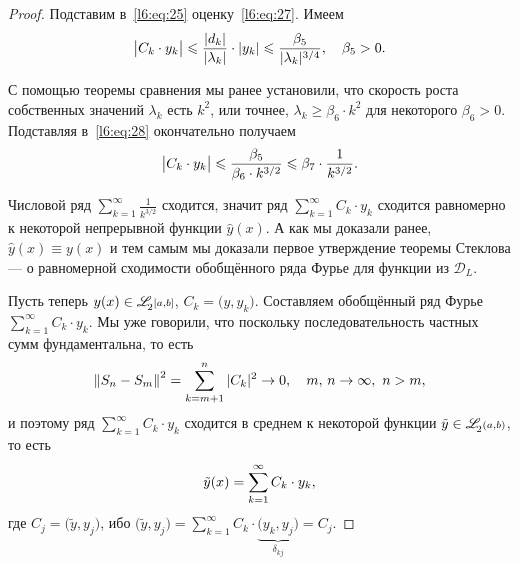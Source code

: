 \documentclass[12pt,a4paper,openany,fleqn]{book}
\newcommand{\mc}[1]{\ensuremath{\mathcal{#1}}}
\newcommand{\fL}[1][{[a,b]}]{\ensuremath{\mathscr{L}\hspace*{-0.11 cm}{\mathstrut}_{2}\scriptstyle#1}}
\newcommand{\norm}[1]{\ensuremath{\left\|#1\right\|}}
\theoremstyle{definition}
\begin{document}
\begin{proof}
	\noindent Подставим в~\eqref{l6:eq:25} оценку~\eqref{l6:eq:27}. Имеем 
	\begin{equation}
		\label{l6:eq:28}
		\hfill\big|C_k\cdot y_k\big|\leqslant\frac{|d_k|}{|\lambda_k|}\cdot|y_k|\leqslant\frac{\beta_5}{|\lambda_k|^{3/4}},\quad\beta_5>0.\hfill
	\end{equation}

	С помощью теоремы сравнения мы ранее установили, что скорость роста собственных значений $\lambda_k$ есть $k^2$, или точнее, $\lambda_k\geqslant\beta_6\cdot k^2$ для некоторого $\beta_6>0$. Подставляя в~\eqref{l6:eq:28} окончательно получаем 
	\begin{equation}
		\hfill\big|C_k\cdot y_k\big|\leqslant\frac{\beta_5}{\beta_6\cdot k^{3/2}}\leqslant\beta_7\cdot\frac{1}{k^{3/2}}.\hfill
	\end{equation}

	Числовой ряд $\sum\limits_{k=1}^{\infty}\frac{\textstyle1}{\textstyle k^{3/2}}$ сходится, значит ряд $\sum\limits_{k=1}^{\infty}C_k\cdot y_k$ сходится равномерно к некоторой непрерывной функции $\hat{y}(x)$. А как мы доказали ранее, $\hat{y}(x)\equiv y(x)$ и тем самым мы доказали первое утверждение теоремы Стеклова --- о равномерной сходимости обобщённого ряда Фурье для функции из $\mc{D}_L$.
	\vspace{0,2cm}
	
	Пусть теперь $y(x)\in\fL$, $C_k=\big(y,y_k\big)$. Составляем обобщённый ряд Фурье $\sum\limits_{k=1}^{\infty}C_k\cdot y_k$. Мы уже говорили, что поскольку последовательность частных сумм фундаментальна, то есть
	\begin{equation*}
		\hfill{\norm{S_n-S_m}}^2=\sum\limits_{k=m+1}^n|C_k|^2\to0,\quad m,\,n\to\infty,\ n>m,\hfill
	\end{equation*}
	и поэтому ряд $\sum\limits_{k=1}^{\infty}C_k\cdot y_k$ сходится в среднем к некоторой функции $\tilde{y}\in\fL[(a,b)]$, то есть
	\begin{equation}
		\label{l6:eq:30}
		\hfill \tilde{y}(x)=\sum\limits_{k=1}^{\infty}C_k\cdot y_k,\hfill
	\end{equation}
	где $C_j=\big(\tilde{y},y_j\big)$, ибо $\big(\tilde{y},y_j\big)=\sum\limits_{k=1}^{\infty}C_k\cdot\underbrace{\big(y_k,y_j\big)}_{\delta_{kj}}=C_j$.
	

\end{proof}
\end{document}
